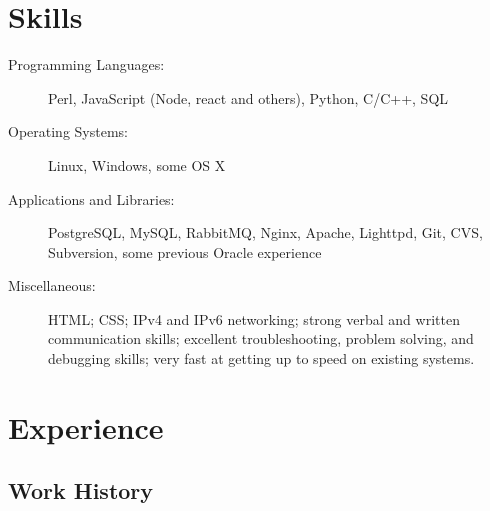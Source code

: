 \documentclass[table,tmargin=1in,bmargin=1in,letterpaper]{resume}
\author{Ryan Voots}
\begin{document}
\maketitle
\vspace{0.1in}

\section{Skills}
\begin{description}
\item[Programming Languages:]
Perl, JavaScript (Node, react and others), Python, C/C++, SQL
\item[Operating Systems:]
Linux, Windows, some OS X
\item[Applications and Libraries:]
PostgreSQL, MySQL, RabbitMQ, Nginx, Apache, Lighttpd, Git, CVS, Subversion, some previous Oracle experience
\item[Miscellaneous:]
HTML; CSS; IPv4 and IPv6 networking; strong verbal and written communication skills; excellent troubleshooting, problem solving, and debugging skills; very fast at getting up to speed on existing systems.
\end{description}

\section{Experience}

\subsection{Work History}
\end{document}
